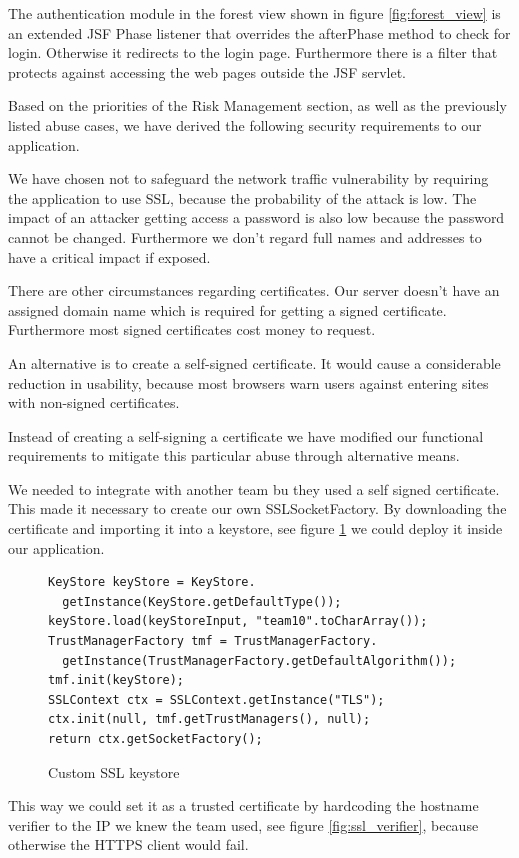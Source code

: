 \documentclass[a4paper]{article}
\begin{document}
The authentication module in the forest view shown in figure \ref{fig:forest_view} is an extended JSF Phase listener that overrides the afterPhase method to check for login. Otherwise it redirects to the login page.
Furthermore there is a filter that protects against accessing the web pages outside the JSF servlet.  
  

Based on the priorities of the Risk Management section, as well as the previously listed abuse cases, we have derived the following security requirements to our application.



We have chosen not to safeguard the network traffic vulnerability by requiring the application to use SSL, because the probability of the attack is low. The impact of an attacker getting access a password is also low because the password cannot be changed. Furthermore we don't regard full names and addresses to have a critical impact if exposed.


There are other circumstances regarding certificates. Our server doesn't have an assigned domain name which is required for getting a signed certificate. Furthermore most signed certificates cost money to request.

An alternative is to create a self-signed certificate. It would cause a considerable reduction in usability, because most browsers warn users against entering sites with non-signed certificates. 

Instead of creating a self-signing a certificate we have modified our functional requirements to mitigate this particular abuse through alternative means.

We needed to integrate with another team bu they used a self signed certificate. This made it necessary to create our own SSLSocketFactory. By downloading the certificate and importing it into a keystore, see figure \ref{fig:ssl_keystore} we could deploy it inside our application. 
\begin{figure}[h!]
\caption{Custom SSL keystore}
\label{fig:ssl_keystore}   
\begin{lstlisting}
KeyStore keyStore = KeyStore.
  getInstance(KeyStore.getDefaultType());
keyStore.load(keyStoreInput, "team10".toCharArray());
TrustManagerFactory tmf = TrustManagerFactory.
  getInstance(TrustManagerFactory.getDefaultAlgorithm());
tmf.init(keyStore);
SSLContext ctx = SSLContext.getInstance("TLS");
ctx.init(null, tmf.getTrustManagers(), null);
return ctx.getSocketFactory();
\end{lstlisting}
\end{figure}
This way we could set it as a trusted certificate by hardcoding the hostname verifier to the IP we knew the team used, see figure \ref{fig:ssl_verifier}, because otherwise the HTTPS client would fail.
\end{document}
